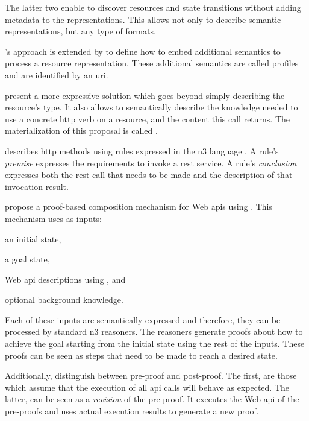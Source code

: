 The latter two enable to discover resources and state transitions without adding metadata to the representations.
This allows not only to describe semantic representations, but any type of formats.

\citeauthor{mark_web_2010}'s \citep{mark_web_2010} approach is extended by \citet{erik_profile_2013} to define how to embed additional semantics to process a resource representation.
These additional semantics are called profiles and are identified by an \acs{uri}.


\bigskip


\citet{verborgh_ijcs_2014} present a more expressive solution which goes beyond simply describing the resource's type.
It also allows to semantically describe the knowledge needed to use a concrete \acs{http} verb on a resource, and the content this call returns. %
The materialization of this proposal is called \restdesc{} \citep{verborgh_functional_2012}.


\restdesc{} describes \acs{http} methods using rules expressed in the \ac{n3} language .
A rule's \emph{premise} expresses the requirements to invoke a \ac{rest} service.
A rule's \emph{conclusion} expresses both the \ac{rest} call that needs to be made and the description of that invocation result.


\citet{verborgh_ijcs_2014} propose a proof-based composition mechanism for Web \acp{api} using \restdesc{}.
This mechanism uses as inputs:
\begin{enumerate*}[label=\itshape(\arabic*\upshape)]
  \item an initial state,
  \item a goal state,
  \item Web \ac{api} descriptions using \restdesc{}, and
  \item optional background knowledge.
\end{enumerate*}
Each of these inputs are semantically expressed and therefore, they can be processed by standard \ac{n3} reasoners.
The reasoners generate proofs about how to achieve the goal starting from the initial state using the rest of the inputs.
These proofs can be seen as steps that need to be made to reach a desired state.


Additionally, \citet{verborgh_ijcs_2014} distinguish between pre-proof and post-proof.
The first, are those which assume that the execution of all \acs{api} calls will behave as expected.
The latter, can be seen as a \emph{revision} of the pre-proof.
It executes the Web \acs{api} of the pre-proofs and uses actual execution results to generate a new proof.

